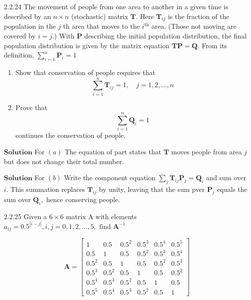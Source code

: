 \documentclass{article}
\begin{document}
\begin{flushleft}
\begin{mybox}{2.2.24}
The movement of people from one area to another in a given time is described by an $n \times n$ (stochastic) matrix $\mathbf{T}$. Here $\mathbf{T}_{i j}$ is the fraction of the population in the $j$ th area that moves to the $i^{\text{th}}$ area. (Those not moving are covered by $i=j.$) With $\mathbf{P}$ describing the initial population distribution, the final population distribution is given by the matrix equation $\mathbf{TP}=\mathbf{Q}$. From its definition, $\sum_{i=1}^{n} \mathbf{P}_{i}=1$

\begin{enumerate}[$(a)$]
\item Show that conservation of people requires that
$$
\sum_{i=1}^{n} \mathbf{T}_{i j}=1, \quad j=1,2, \ldots, n
$$
\item Prove that
$$
\sum_{i=1}^{n} \mathbf{Q}_{i}=1
$$
continues the conservation of people.
\end{enumerate}
\end{mybox}




$\boxed{\textbf{Solution}}$  For $(a)$ The equation of part states that $\mathbf{T}$ moves people from area $j$ but
does not change their total number. 



$\boxed{\textbf{Solution}}$ For $(b)$ Write the component equation $\sum_{j} \mathbf{T}_{i j} \mathbf{P}_{j}=\mathbf{Q}_{i}$ and sum over $i.$ This summation replaces $\mathbf{T}_{i j}$ by unity, leaving that the sum pver $\mathbf{P}_{j}$ equals the sum over $\mathbf{Q}_{i},$ hence conserving people.


\newpage

\begin{mybox}{2.2.25}
Given a $6 \times 6$ matrix A with elements $a_{i j}=0.5^{|i-j|}, i, j=0,1,2, \ldots, 5, \text { find } \mathbf{A}^{-1}$

$$\mathbf{A}=\begin{bmatrix}
1 & 0.5 & 0.5^2 & 0.5^3 & 0.5^4 & 0.5^5 \\ 
0.5 & 1 & 0.5 & 0.5^2 & 0.5^3 & 0.5^4 \\ 
0.5^2 & 0.5 & 1 & 0.5 & 0.5^2 & 0.5^3\\ 
0.5^3 & 0.5^2 & 0.5 & 1 & 0.5 & 0.5^2\\ 
0.5^4 & 0.5^3 & 0.5^2 & 0.5 & 1 & 0.5\\ 
0.5^5 & 0.5^4 & 0.5^3 & 0.5^2 & 0.5 & 1
\end{bmatrix}$$
\end{mybox}


\end{flushleft}
\end{document}
